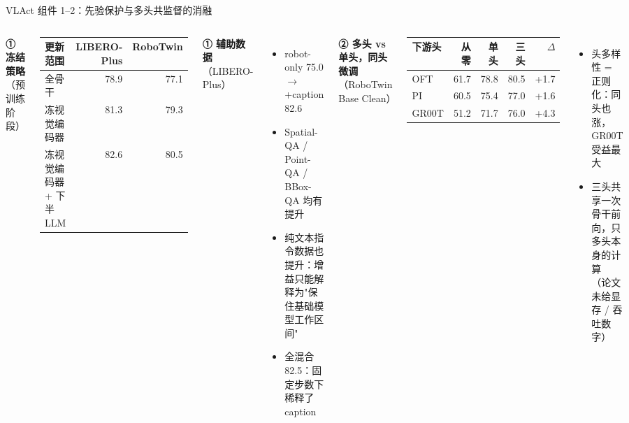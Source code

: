 \documentclass[aspectratio=169,10pt]{beamer}
\newcommand{\pos}[1]{\textcolor{positive}{#1}}
\newcommand{\HL}[1]{\textcolor{emphasis}{#1}}
\newcommand{\mute}[1]{\textcolor{neutral}{#1}}
\begin{document}
\begin{frame}{VLAct 组件 1--2：先验保护与多头共监督的消融}
  \begin{columns}[T]
    \textbf{① 冻结策略}（预训练阶段）
    \begin{center}\footnotesize
    \begin{tabular}{lrr}
      \toprule
      更新范围 & LIBERO-Plus & RoboTwin \\
      \midrule
      全骨干 & 78.9 & 77.1 \\
      冻视觉编码器 & 81.3 & 79.3 \\
      冻视觉编码器 + 下半 LLM & \HL{82.6} & \HL{80.5} \\
      \bottomrule
    \end{tabular}
    \end{center}
    \vspace{4pt}
    \textbf{① 辅助数据}（LIBERO-Plus）
    \begin{itemize}
      \item robot-only 75.0 $\to$ +caption \HL{82.6}
      \item Spatial-QA / Point-QA / BBox-QA 均有提升
      \item \pos{纯文本指令数据也提升}：增益只能解释为"保住基础模型工作区间"
      \item 全混合 82.5：固定步数下稀释了 caption
    \end{itemize}
    \textbf{② 多头 vs 单头，同头微调}（RoboTwin Base Clean）
    \begin{center}\footnotesize
    \begin{tabular}{lrrrr}
      \toprule
      下游头 & 从零 & 单头 & 三头 & $\Delta$ \\
      \midrule
      OFT & 61.7 & 78.8 & \HL{80.5} & +1.7 \\
      PI & 60.5 & 75.4 & \HL{77.0} & +1.6 \\
      GR00T & 51.2 & 71.7 & \HL{76.0} & +4.3 \\
      \bottomrule
    \end{tabular}
    \end{center}
    \vspace{6pt}
    \begin{itemize}
      \item 头多样性 = 正则化：同头也涨，GR00T 受益最大
      \item 三头共享一次骨干前向，只多头本身的计算 \mute{（论文未给显存 / 吞吐数字）}
    \end{itemize}
  \end{columns}
\end{frame}
\end{document}
